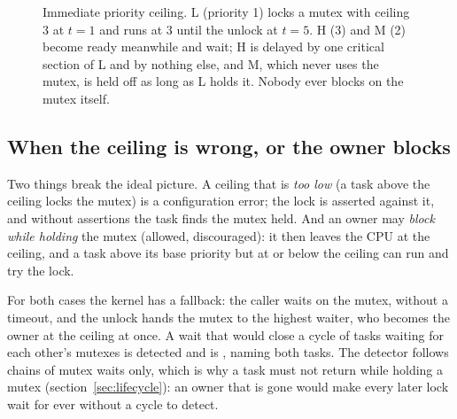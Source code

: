 \begin{figure}[htbp]
\centering
{}
\caption{Immediate priority ceiling. L (priority 1) locks a mutex with ceiling 3 at $t=1$
and runs at 3 until the unlock at $t=5$. H (3) and M (2) become ready meanwhile and
wait; H is delayed by one critical section of L and by nothing else, and M, which never
uses the mutex, is held off as long as L holds it. Nobody ever blocks on the mutex
itself.}
\label{fig:ceiling}
\end{figure}

\subsection{When the ceiling is wrong, or the owner blocks}

Two things break the ideal picture. A ceiling that is \emph{too low} (a task above the
ceiling locks the mutex) is a configuration error; the lock is asserted against it, and
without assertions the task finds the mutex held. And an owner may \emph{block while
holding} the mutex (allowed, discouraged): it then leaves the CPU at the ceiling, and a
task above its base priority but at or below the ceiling can run and try the lock.

For both cases the kernel has a fallback: the caller waits on the mutex, without a
timeout, and the unlock hands the mutex to the highest waiter, who becomes the owner at
the ceiling at once. A wait that would close a cycle of tasks waiting for each other's
mutexes is detected and is , naming both tasks. The detector
follows chains of mutex waits only, which is why a task must not return while holding a
mutex (section~\ref{sec:lifecycle}): an owner that is gone would make every later lock
wait for ever without a cycle to detect.

